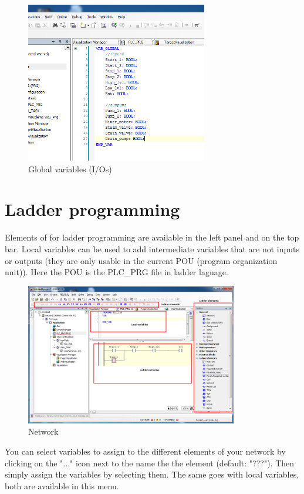 \documentclass[10pt,a4paper]{article}
\begin{document}
\begin{figure}[h!]
	\begin{center}
		\includegraphics[width=300px]{img6.PNG}
	\end{center}
\caption{Global variables (I/Os)}
\label{fig:glob_var}
\end{figure}


\section{Ladder programming}

Elements of for ladder programming are available in the left panel and on the top bar.
Local variables can be used to add intermediate variables that are not inputs or outputs (they are only usable in the current POU (program organization unit)). Here the POU is the PLC\_PRG file in ladder laguage.

\begin{figure}[h!]
	\begin{center}
		\includegraphics[width=350px]{img7.PNG}
	\end{center}
\caption{Network}
\label{fig:network}
\end{figure}

You can select variables to assign to the different elements of your network by clicking on the "..." icon next to the name the the element (default: "???").
Then simply assign the variables by selecting them.
The same goes with local variables, both are available in this menu.
\end{document}
